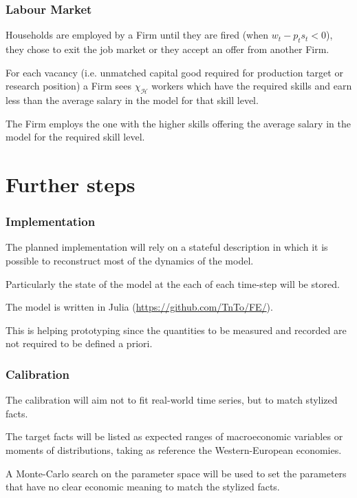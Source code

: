 \documentclass[]{beamer}
\begin{document}
\begin{frame}
	\frametitle{Labour Market}
	Households are employed by a Firm until they are fired (when $w_t - p_t s_t < 0$), they chose to exit the job market or they accept an offer from another Firm.

	For each vacancy (i.e. unmatched capital good required for production target or research position) a Firm sees $\chi_\mathcal{H}$ workers which have the required skills and earn less than the average salary in the model for that skill level.

	The Firm employs the one with the higher skills offering the average salary in the model for the required skill level.
\end{frame}

\section{Further steps}
\begin{frame}
	\frametitle{Implementation}
	The planned implementation will rely on a stateful description in which it is possible to reconstruct most of the dynamics of the model.

	Particularly the state of the model at the each of each time-step will be stored.

	The model is written in Julia (\url{https://github.com/TnTo/FE/}).

	This is helping prototyping since the quantities to be measured and recorded are not required to be defined a priori.
\end{frame}

\begin{frame}
	\frametitle{Calibration}
	The calibration will aim not to fit real-world time series, but to match stylized facts.

	The target facts will be listed as expected ranges of macroeconomic variables or moments of distributions, taking as reference the Western-European economies.

	A Monte-Carlo search on the parameter space will be used to set the parameters that have no clear economic meaning to match the stylized facts.
\end{frame}
\end{document}
